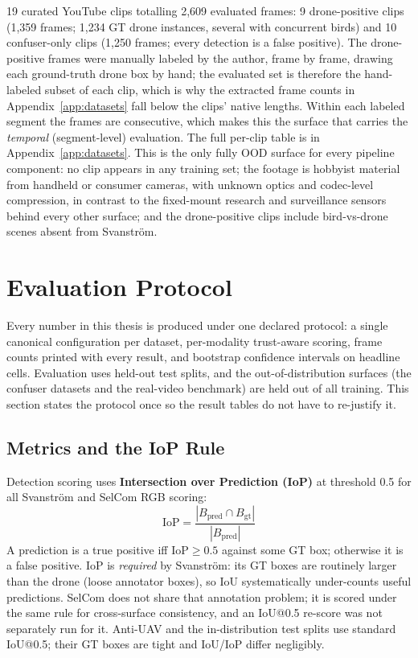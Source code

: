 19 curated YouTube clips totalling 2{,}609 evaluated frames: 9 drone-positive clips (1{,}359 frames; 1{,}234 GT drone instances, several with concurrent birds) and 10 confuser-only clips (1{,}250 frames; every detection is a false positive). The drone-positive frames were manually labeled by the author, frame by frame, drawing each ground-truth drone box by hand; the evaluated set is therefore the hand-labeled subset of each clip, which is why the extracted frame counts in Appendix~\ref{app:datasets} fall below the clips' native lengths. Within each labeled segment the frames are consecutive, which makes this the surface that carries the \emph{temporal} (segment-level) evaluation. The full per-clip table is in Appendix~\ref{app:datasets}. This is the only fully OOD surface for every pipeline component: no clip appears in any training set; the footage is hobbyist material from handheld or consumer cameras, with unknown optics and codec-level compression, in contrast to the fixed-mount research and surveillance sensors behind every other surface; and the drone-positive clips include bird-vs-drone scenes absent from Svanstr\"om.

\section{Evaluation Protocol}
\label{sec:eval_protocol}

Every number in this thesis is produced under one declared protocol: a single canonical configuration per dataset, per-modality trust-aware scoring, frame counts printed with every result, and bootstrap confidence intervals on headline cells. Evaluation uses held-out test splits, and the out-of-distribution surfaces (the confuser datasets and the real-video benchmark) are held out of all training. This section states the protocol once so the result tables do not have to re-justify it.

\subsection{Metrics and the IoP Rule}
\label{sec:metrics}

Detection scoring uses \textbf{Intersection over Prediction (IoP)} at threshold 0.5 for all Svanstr\"om and SelCom RGB scoring:
\[
\text{IoP} = \frac{|B_\text{pred} \cap B_\text{gt}|}{|B_\text{pred}|}
\]
A prediction is a true positive iff $\text{IoP} \geq 0.5$ against some GT box; otherwise it is a false positive. IoP is \emph{required} by Svanstr\"om: its GT boxes are routinely larger than the drone (loose annotator boxes), so IoU systematically under-counts useful predictions. SelCom does not share that annotation problem; it is scored under the same rule for cross-surface consistency, and an IoU@0.5 re-score was not separately run for it. Anti-UAV and the in-distribution test splits use standard IoU@0.5; their GT boxes are tight and IoU/IoP differ negligibly.

